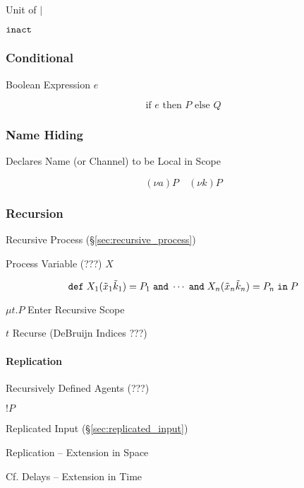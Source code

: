 Unit of $|$

$\mathtt{inact}$



\subsubsection{Conditional}\label{sec:conditional}

Boolean Expression $e$

\[
  \text{if } e \text{ then } P \text{ else } Q
\]



\subsubsection{Name Hiding}\label{sec:name_hiding}

Declares Name (or Channel) to be Local in Scope

\[
  (\nu a)P \quad (\nu k)P
\]



\subsubsection{Recursion}\label{sec:process_recursion}

Recursive Process (\S\ref{sec:recursive_process})

Process Variable (???) $X$

\[
  \mathtt{def} \; X_1(\tilde{x}_1 \tilde{k}_1)
  = P_1 \; \mathtt{and} \; \cdots \; \mathtt{and} \;
  X_n(\tilde{x}_n \tilde{k}_n) = P_n \; \mathtt{in} \; P
\]

$\mu t.P$ Enter Recursive Scope

$t$ Recurse (DeBruijn Indices ???) %



\paragraph{Replication}\label{sec:replication}\hfill

Recursively Defined Agents (???)

$!P$

Replicated Input (\S\ref{sec:replicated_input})

Replication -- Extension in Space

\fist Cf. Delays -- Extension in Time \cite{abramsky-gay-nagarajan96}




